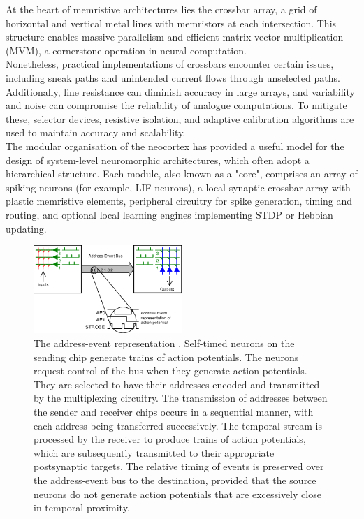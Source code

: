 At the heart of memristive architectures lies the crossbar array, a grid of horizontal and vertical metal lines with memristors at each intersection. This structure enables massive parallelism and efficient matrix-vector multiplication (MVM), a cornerstone operation in neural computation. \\

\noindent Nonetheless, practical implementations of crossbars encounter certain issues, including sneak paths and unintended current flows through unselected paths. Additionally, line resistance can diminish accuracy in large arrays, and variability and noise can compromise the reliability of analogue computations. To mitigate these, selector devices, resistive isolation, and adaptive calibration algorithms are used to maintain accuracy and scalability.\\

\noindent The modular organisation of the neocortex has provided a useful model for the design of system-level neuromorphic architectures, which often adopt a hierarchical structure. Each module, also known as a "core", comprises an array of spiking neurons (for example, LIF neurons), a local synaptic crossbar array with plastic memristive elements, peripheral circuitry for spike generation, timing and routing, and optional local learning engines implementing STDP or Hebbian updating.\\

\begin{figure}[htbp!] 
    \centering    
    \includegraphics[width=0.5\textwidth]{Chapter2/Figs/i.png}
    \caption[The address-event representation.]{The address-event representation \cite{deiss1999pulse}. Self-timed neurons on the sending chip generate trains of action potentials. The neurons request control of the bus when they generate action potentials. They are selected to have their addresses encoded and transmitted by the multiplexing circuitry. The transmission of addresses between the sender and receiver chips occurs in a sequential manner, with each address being transferred successively. The temporal stream is processed by the receiver to produce trains of action potentials, which are subsequently transmitted to their appropriate postsynaptic targets. The relative timing of events is preserved over the address-event bus to the destination, provided that the source neurons do not generate action potentials that are excessively close in temporal proximity.}
    \label{fig:2i}
\end{figure}
    
